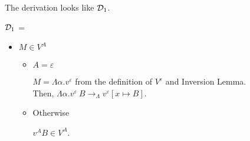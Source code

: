 \begin{itemize}
	      The derivation looks like $\mathcal{D}_1$.
	      	      	      	      	      	      	      	      	      	      		      	      	      	      
	      $\mathcal{D}_1$ = 
	      {}
	      	      	      	      	      	      	      	      	      	      		      	      	      	      
	      \begin{itemize}
	      	\item $ M \in V^A $
	      	      	      	      	      	      	      	      	      	      	      	      	      	      	      	      	      	      	      	      		      	      	      	      	      	      	      	      
	      	      \begin{itemize}
	      	      	\item $A=\varepsilon$
	      	      	      	      	      	      	      	      	      	      	      	      	      	      	      	      	      	      	      	      	      	      	      	      	      	      	      	      	      	      		      	      	      	      	      	      	      	      	      	      	      	      
	      	      	      $M = \Lambda\alpha.v^\varepsilon$ from the definition of $V^\varepsilon$ and Inversion Lemma.\\
	      	      	      Then, $\Lambda\alpha.v^\varepsilon\ B \longrightarrow_\Lambda v^\varepsilon[x\mapsto B]$.
	      	      	      	      	      	      	      	      	      	      	      	      	      	      	      	      	      	      	      	      	      	      	      	      	      	      	      	      	      	      		      	      	      	      	      	      	      	      	      	      	      	      
	      	      	\item Otherwise
	      	      	      	      	      	      	      	      	      	      	      	      	      	      	      	      	      	      	      	      	      	      	      	      	      	      	      	      	      	      		      	      	      	      	      	      	      	      	      	      	      	      
	      	      	      $v^A B \in V^A$.
	      	      \end{itemize}
	      	      	      	      	      	      	      	      	      	      	      	      	      	      	      	      	      	      	      	      		      	      	      	      	      	      	      	      

\end{itemize}
\end{itemize}
